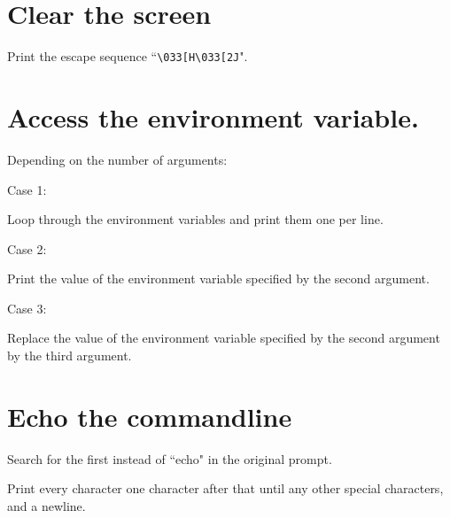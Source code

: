 \documentclass{article}
\begin{document}
\section{Clear the screen}
\begin{deepenum}
    \item
        Print the escape sequence ``\verb|\033[H\033[2J|".
\end{deepenum}

\section{Access the environment variable.}
\begin{deepenum}
    \item
        Depending on the number of arguments:
        \begin{deepenum}
            \item
                Case 1:
                \begin{deepenum}
                    \item
                        Loop through the environment variables and print them one per line.
                \end{deepenum}
            \item
                Case 2:
                \begin{deepenum}
                    \item
                        Print the value of the environment variable specified by the second argument.
                \end{deepenum}
            \item
                Case 3:
                \begin{deepenum}
                    \item
                        Replace the value of the environment variable specified by the second argument by the third argument.
                \end{deepenum}
        \end{deepenum}
\end{deepenum}

\section{Echo the commandline}
\begin{deepenum}
    \item
        Search for the first instead of ``echo" in the original prompt.
    \item
        Print every character one character after that until any other special characters, and a newline.
\end{deepenum}
\end{document}
